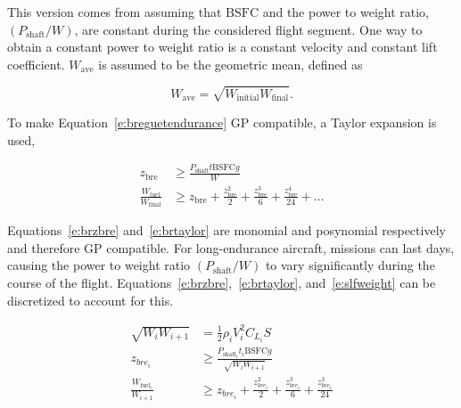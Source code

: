 This version comes from assuming that $\text{BSFC}$ and the power to weight ratio, $(P_{\text{shaft}}/W)$, are constant during the considered flight segment. 
One way to obtain a constant power to weight ratio is a constant velocity and constant lift coefficient.\cite{br2}
$W_{\text{ave}}$ is assumed to be the geometric mean, defined as

% 
% 
% 
% 

\begin{equation}
    \label{e:gpmean}
    W_{\text{ave}} = \sqrt{W_{\text{initial}}W_{\text{final}}}.
\end{equation}

    To make Equation~\eqref{e:breguetendurance} GP compatible, a Taylor expansion is used,\cite{hoburgthesis}

\begin{align}
    \label{e:brzbre}
    z_{\text{bre}} &\geq \frac{P_{\text{shaft}}t \text{BSFC} g}{W}\\
    \label{e:brtaylor}
    \frac{W_{\text{fuel}}}{W_\text{final}} &\geq z_{\text{bre}} + \frac{z_{\text{bre}}^2}{2} + \frac{z_{\text{bre}}^3}{6} + \frac{z_{\text{bre}}^4}{24} + \dots
\end{align}

    Equations~\eqref{e:brzbre} and~\eqref{e:brtaylor} are monomial and posynomial respectively and therefore GP compatible. For long-endurance aircraft, missions can last days, causing the power to weight ratio $(P_{\text{shaft}}/W)$ to vary significantly during the course of the flight.  
    Equations~\eqref{e:brzbre},~\eqref{e:brtaylor}, and~\eqref{e:slfweight} can be discretized to account for this.

\begin{align}
    \label{e:slfweightd}
    \sqrt{W_i W_{i+1}} &= \frac{1}{2} \rho_i V_i^2 C_{L_i} S \\
    \label{e:brzbred}
    z_{bre_i} &\geq \frac{P_{\text{shaft}_i}t_i \text{BSFC} g}{\sqrt{W_i W_{i+1}}}\\
    \label{e:brtaylord}
    \frac{W_{\text{fuel}_i}}{W_{i+1}} &\geq z_{bre_i} + \frac{z_{bre_i}^2}{2} + \frac{z_{bre_i}^3}{6} + \frac{z_{bre_i}^3}{24} 
    \end{align}


